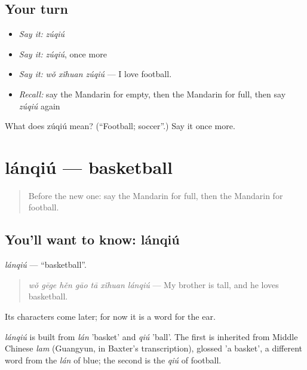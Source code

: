 \subsection*{Your turn}
\begin{itemize}
\raggedright
  \item \emph{Say it:} \emph{zúqiú}
  \item \emph{Say it:} \emph{zúqiú}, once more
  \item \emph{Say it:} \emph{wǒ xǐhuan zúqiú} — I love football.
  \item \emph{Recall:} say the Mandarin for empty, then the Mandarin for full, then say \emph{zúqiú} again
\end{itemize}

\begin{tcolorbox}[breakable,colback=teal!4,colframe=teal!35!black,title={Before you move on}]
What does zúqiú mean? (\textquotedblleft{}Football; soccer\textquotedblright{}.) Say it once more.
\end{tcolorbox}
\section[lánqiú]{lánqiú — basketball}

\label{lesson:ZH-C135-lanqiu}



\begin{quote}
Before the new one: say the Mandarin for full, then the Mandarin for football.
\end{quote}

\subsection*{You'll want to know: lánqiú}
\emph{lánqiú} — \textquotedblleft{}basketball\textquotedblright{}.

\begin{quote}
\emph{wǒ gēge hěn gāo tā xǐhuan lánqiú} — My brother is tall, and he loves basketball.
\end{quote}

Its characters come later; for now it is a word for the ear.

\begin{cousinweb}
\emph{lánqiú} is built from \emph{lán} 'basket' and \emph{qiú} 'ball'. The first is inherited from Middle Chinese \emph{lam} (Guangyun, in Baxter's transcription), glossed 'a basket', a different word from the \emph{lán} of blue; the second is the \emph{qiú} of football.
\end{cousinweb}

